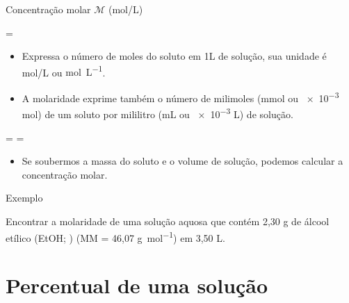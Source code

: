 \documentclass[presentation,professionalfonts,aspectratio=169]{beamer}
\begin{document}
\begin{frame}[label={sec:orgbd017e9}]{Concentração molar \(\mathcal{M}\) (mol/L)}
\begin{tcolorbox}
=
\end{tcolorbox}

\begin{itemize}
\item Expressa o número de moles do soluto em 1L de solução, sua unidade é \alert{mol/L} ou \alert{\unit{\mole\per\liter}}.
\item A molaridade exprime também o número de milimoles (mmol ou \num{e-3} mol) de um soluto por mililitro (mL ou \num{e-3} L) de solução.
\end{itemize}

\begin{tcolorbox}
= \Longrightarrow {}=
\end{tcolorbox}

\begin{itemize}
\item Se soubermos a massa do soluto e o volume de solução, podemos calcular a concentração molar.
\end{itemize}
\end{frame}

\begin{frame}[label={sec:org3d06f64}]{Exemplo}
\begin{question}
Encontrar a molaridade de uma solução aquosa que contém 2,30 g de álcool etílico (EtOH; ) (MM = 46,07 \unit{\gram\per\mole}) em 3,50 L.
\end{question}

\end{frame}


\section{Percentual de uma solução}
\label{sec:org16fb2bd}
\end{document}
